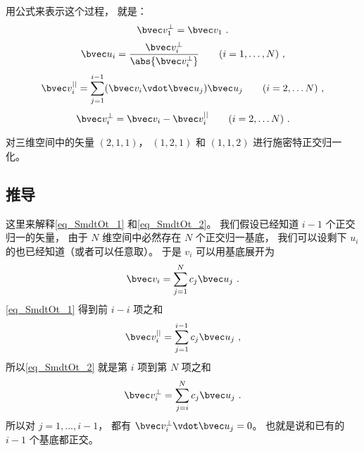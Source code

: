 用公式来表示这个过程， 就是：
\begin{equation}
\bvec v_1^\bot = \bvec v_1~.
\end{equation}
\begin{equation}
\bvec u_i = \frac{\bvec v_i^\bot}{\abs{\bvec v_i^\bot}} \qquad (i = 1, \dots ,N)~,
\end{equation}
\begin{equation}\label{eq_SmdtOt_1}
\bvec v_i^{||} = \sum _{j=1}^{i-1} (\bvec v_i \vdot \bvec u_j) \bvec u_j \qquad (i = 2, \dots N)~,
\end{equation}
\begin{equation}\label{eq_SmdtOt_2}
\bvec v_i^\bot = \bvec v_i - \bvec v_i^{||} \qquad (i = 2, \dots N)~.
\end{equation}

\begin{exercise}{}
对三维空间中的矢量 $(2, 1, 1)$， $(1, 2, 1)$ 和 $(1, 1, 2)$ 进行施密特正交归一化。
\end{exercise}

\subsection{推导}
这里来解释\autoref{eq_SmdtOt_1} 和\autoref{eq_SmdtOt_2}。 我们假设已经知道 $i-1$ 个正交归一的矢量， 由于 $N$ 维空间中必然存在 $N$ 个正交归一基底， 我们可以设剩下 $u_i$ 的也已经知道（或者可以任意取）。 于是 $v_i$ 可以用基底展开为
\begin{equation}
\bvec v_i = \sum _{j=1}^N c_j \bvec u_j~.
\end{equation}
\autoref{eq_SmdtOt_1} 得到前 $i-i$ 项之和
\begin{equation}
\bvec v_i^{||} = \sum _{j=1}^{i-1} c_j\bvec u_j~,
\end{equation}
所以\autoref{eq_SmdtOt_2} 就是第 $i$ 项到第 $N$ 项之和
\begin{equation}
\bvec v_i^\bot = \sum _{j=i}^{N} c_j\bvec u_j~.
\end{equation}
所以对 $j = 1, \dots , i-1$， 都有 $\bvec v_i^\bot \vdot \bvec u_j = 0$。 也就是说和已有的 $i-1$ 个基底都正交。

